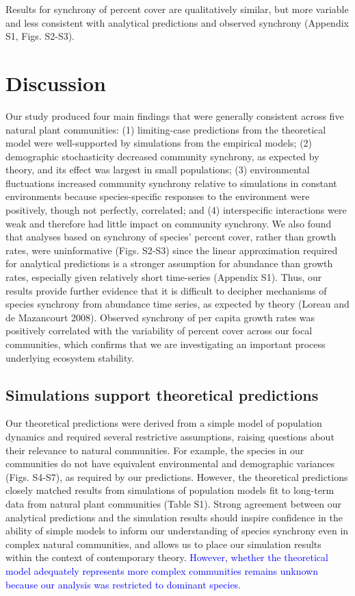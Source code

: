\documentclass[12pt,]{article}
\begin{document}
Results for synchrony of percent cover are qualitatively similar, but
more variable and less consistent with analytical predictions and
observed synchrony (Appendix S1, Figs. S2-S3).

\section{Discussion}

Our study produced four main findings that were generally consistent
across five natural plant communities: (1) limiting-case predictions
from the theoretical model were well-supported by simulations from the
empirical models; (2) demographic stochasticity decreased community
synchrony, as expected by theory, and its effect was largest in small
populations; (3) environmental fluctuations increased community
synchrony relative to simulations in constant environments because
species-specific responses to the environment were positively, though
not perfectly, correlated; and (4) interspecific interactions were weak
and therefore had little impact on community synchrony. We also found
that analyses based on synchrony of species' percent cover, rather than
growth rates, were uninformative (Figs. S2-S3) since the linear
approximation required for analytical predictions is a stronger
assumption for abundance than growth rates, especially given relatively
short time-series (Appendix S1). Thus, our results provide further
evidence that it is difficult to decipher mechanisms of species
synchrony from abundance time series, as expected by theory (Loreau and
{{de Mazancourt}} 2008). Observed synchrony of per capita growth rates
was positively correlated with the variability of percent cover across
our focal communities, which confirms that we are investigating an
important process underlying ecosystem stability.

\subsection{Simulations support theoretical predictions}

Our theoretical predictions were derived from a simple model of
population dynamics and required several restrictive assumptions,
raising questions about their relevance to natural communities. For
example, the species in our communities do not have equivalent
environmental and demographic variances (Figs. S4-S7), as required by
our predictions. However, the theoretical predictions closely matched
results from simulations of population models fit to long-term data from
natural plant communities (Table S1). Strong agreement between our
analytical predictions and the simulation results should inspire
confidence in the ability of simple models to inform our understanding
of species synchrony even in complex natural communities, and allows us
to place our simulation results within the context of contemporary
theory.
\textcolor{blue}{However, whether the theoretical model adequately represents more complex communities remains unknown because our analysis was restricted to dominant species.}
\end{document}
